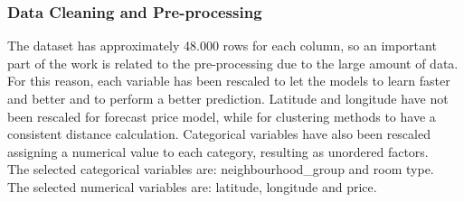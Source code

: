 \documentclass{FR16}
\begin{document}
\subsubsection{Data Cleaning and Pre-processing}

The dataset has approximately 48.000 rows for each column, so an important part of the work is related to the pre-processing due to the large amount of data. For this reason, each variable has been rescaled to let the models to learn faster and better and to perform a better prediction. Latitude and longitude have not been rescaled for forecast price model, while for clustering methods to have a consistent distance calculation. Categorical variables have also been rescaled assigning a numerical value to each category, resulting as unordered factors.\\
The selected categorical variables are: neighbourhood\_group and room type.\\
The selected numerical variables are: latitude, longitude and price.
\\
\end{document}
